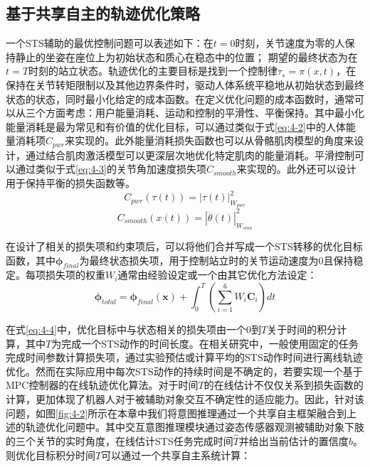 \subsection{基于共享自主的轨迹优化策略}
一个STS辅助的最优控制问题可以表述如下：在$t=0$时刻，关节速度为零的人保持静止的坐姿在座位上为初始状态和质心在稳态中的位置； 期望的最终状态为在$t=T$时刻的站立状态。轨迹优化的主要目标是找到一个控制律$τ_∗= π(x,t)$，在保持在关节转矩限制以及其他边界条件时，驱动人体系统平稳地从初始状态到最终状态的状态，同时最小化给定的成本函数。在定义优化问题的成本函数时，通常可以从三个方面考虑：用户能量消耗、运动和控制的平滑性、平衡保持。其中最小化能量消耗是最为常见和有价值的优化目标，可以通过类似于式\ref{eq:4-2}中的人体能量消耗项$C_{pwr}$来实现的。此外能量消耗损失函数也可以从骨骼肌肉模型的角度来设计，通过结合肌肉激活模型可以更深层次地优化特定肌肉的能量消耗\cite{kumarPredictingSittoStandAdaptations2022}。平滑控制可以通过类似于式\ref{eq:4-3}的关节角加速度损失项$C_{smooth}$来实现的。此外还可以设计用于保持平衡的损失函数等。
\begin{equation}
    C_{pwr}(\tau(t))=|\tau(t)|_{W_{pwr}}^2
    \label{eq:4-2}
\end{equation}
\begin{equation}
    C_{smooth}(x(t))=|\dddot{\theta}(t)|_{W_{smo}}^2
    \label{eq:4-3}
\end{equation}

在设计了相关的损失项和约束项后，可以将他们合并写成一个STS转移的优化目标函数，其中$\boldsymbol{\phi}_{final}$为最终状态损失项，用于控制站立时的关节运动速度为0且保持稳定。每项损失项的权重$W_i$通常由经验设定或一个由其它优化方法设定：
\begin{equation}
    \boldsymbol{\phi}_{total}=\boldsymbol{\phi}_{final}(\boldsymbol{x})+\int_0^T\left(\sum_{i=1}^6 W_i \boldsymbol{C}_i\right) dt
    \label{eq:4-4}
\end{equation}

在式\ref{eq:4-4}中，优化目标中与状态相关的损失项由一个$0$到$T$关于时间的积分计算，其中$T$为完成一个STS动作的时间长度。在相关研究中，一般使用固定的任务完成时间参数计算损失项，通过实验预估或计算平均的STS动作时间进行离线轨迹优化。然而在实际应用中每次STS动作的持续时间是不确定的，若要实现一个基于MPC控制器的在线轨迹优化算法。对于时间$T$的在线估计不仅仅关系到损失函数的计算，更加体现了机器人对于被辅助对象交互不确定性的适应能力。因此，针对该问题，如图\ref{fig:4-2}所示在本章中我们将意图推理通过一个共享自主框架融合到上述的轨迹优化问题中。其中交互意图推理模块通过姿态传感器观测被辅助对象下肢的三个关节的实时角度，在线估计STS任务完成时间$\hat T$并给出当前估计的置信度$b$。则优化目标积分时间$T$可以通过一个共享自主系统计算：

